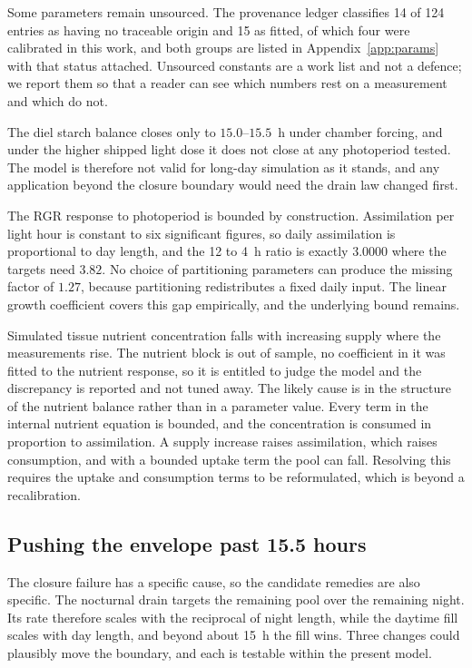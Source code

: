 Some parameters remain unsourced. The provenance ledger classifies 14 of 124
entries as having no traceable origin and 15 as fitted, of which four were
calibrated in this work, and both groups are
listed in Appendix~\ref{app:params} with that status attached. Unsourced
constants are a work list and not a defence; we report them so that a reader
can see which numbers rest on a measurement and which do not.

The diel starch balance closes only to $15.0$--$15.5$~h under chamber forcing,
and under the higher shipped light dose it does not close at any photoperiod
tested. The model is therefore not valid for long-day simulation as it stands,
and any application beyond the closure boundary would need the drain law
changed first.

The RGR response to photoperiod is bounded by construction. Assimilation per
light hour is constant to six significant figures, so daily assimilation is
proportional to day length, and the 12 to 4~h ratio is exactly $3.0000$ where
the targets need $3.82$. No choice of partitioning parameters can produce the
missing factor of $1.27$, because partitioning redistributes a fixed daily
input. The linear growth coefficient covers this gap empirically, and the
underlying bound remains.

Simulated tissue nutrient concentration falls with increasing supply where the
measurements rise. The nutrient block is out of sample, no coefficient in it
was fitted to the nutrient response, so it is entitled to judge the model and
the discrepancy is reported and not tuned away. The likely cause is in the
structure of the nutrient balance rather than in a parameter value. Every term in
the internal nutrient equation is bounded, and the concentration is consumed in
proportion to assimilation. A supply increase raises assimilation,
which raises consumption, and with a bounded uptake term the pool can fall.
Resolving this requires the uptake and consumption terms to be reformulated,
which is beyond a recalibration.

\subsection{Pushing the envelope past 15.5 hours}

The closure failure has a specific cause, so the candidate remedies are also
specific. The nocturnal drain targets the remaining pool over the remaining
night. Its rate therefore scales with the reciprocal of night length, while the
daytime fill scales with day length, and beyond about 15~h the fill wins. Three
changes could plausibly move the boundary, and each is testable within the
present model.

